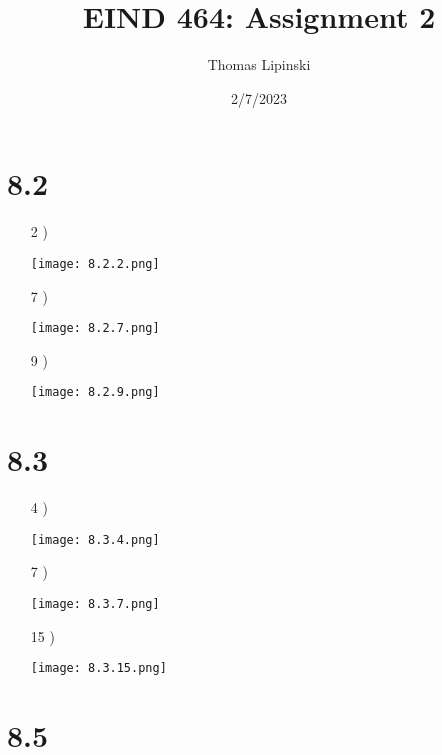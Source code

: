 \documentclass{article}
\title {EIND 464: Assignment 2}
\date{2/7/2023}
\author{Thomas Lipinski}
\begin{document}
\maketitle
\section*{8.2}

\begin{enumerate}
\item[2 )] \begin{center}\texttt{[image: 8.2.2.png]}\end{center}


\item[7 )] \begin{center}\texttt{[image: 8.2.7.png]}\end{center}

\item[9 )]\begin{center}\texttt{[image: 8.2.9.png]}\end{center}
\end{enumerate}

\section*{8.3}

\begin{enumerate}
\item[4 )]\begin{center}\texttt{[image: 8.3.4.png]}\end{center}

\item[7 )]\begin{center}\texttt{[image: 8.3.7.png]}\end{center}

\item[15 )]\begin{center}\texttt{[image: 8.3.15.png]}\end{center}
\end{enumerate}

\section*{8.5}
\end{document}
